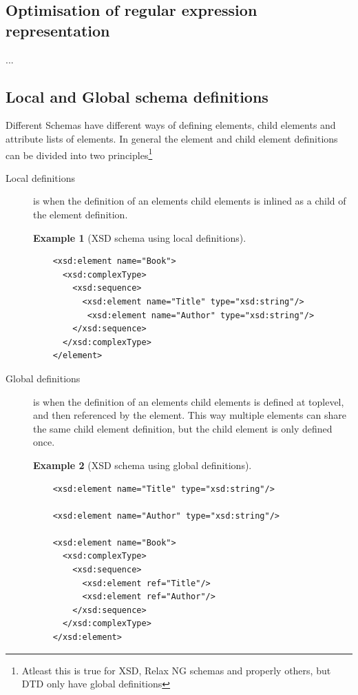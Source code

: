 \documentclass[a4paper, oneside]{memoir}
\theoremstyle{definition}
\newtheorem{example}{Example}
\begin{document}
\subsection{Optimisation of regular expression representation}
...

\subsection{Local and Global schema definitions}
\label{sec:local-global-schema-definitions}
Different Schemas have different ways of defining elements, child elements and
attribute lists of elements. In general the element and child element
definitions can be divided into two principles\footnote{Atleast this is true for
  XSD, Relax NG schemas and properly others, but DTD only have global definitions}

\begin{description}
\item[Local definitions] is when the definition of an elements child elements is
  inlined as a child of the element definition. 

  \begin{example}[XSD schema using local definitions] \ %
\begin{verbatim}
    <xsd:element name="Book"> 
      <xsd:complexType> 
        <xsd:sequence> 
          <xsd:element name="Title" type="xsd:string"/> 
           <xsd:element name="Author" type="xsd:string"/> 
        </xsd:sequence> 
      </xsd:complexType> 
    </element>
\end{verbatim}
  \end{example}

\item[Global definitions] is when the definition of an elements child elements
  is defined at toplevel, and then referenced by the element. This way multiple
  elements can share the same child element definition, but the child element is
  only defined once.

  \begin{example}[XSD schema using global definitions] \ %
\begin{verbatim}
    <xsd:element name="Title" type="xsd:string"/>

    <xsd:element name="Author" type="xsd:string"/>

    <xsd:element name="Book">
      <xsd:complexType> 
        <xsd:sequence> 
          <xsd:element ref="Title"/> 
          <xsd:element ref="Author"/>
        </xsd:sequence> 
      </xsd:complexType> 
    </xsd:element>
\end{verbatim}
  \end{example}

\end{description}
\end{document}
